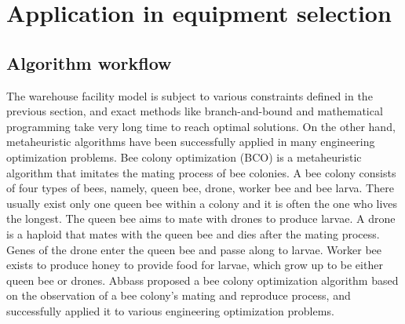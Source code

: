 \section{Application in equipment selection}
\subsection{Algorithm workflow}
The warehouse facility model is subject to various constraints defined in the previous section, and exact methods like branch-and-bound and mathematical programming take very long time to reach optimal solutions.
On the other hand, metaheuristic algorithms have been successfully applied in many engineering optimization problems.
Bee colony optimization (BCO) is a metaheuristic algorithm that imitates the mating process of bee colonies.
A bee colony consists of four types of bees, namely, queen bee, drone, worker bee and bee larva. 
There usually exist only one queen bee within a colony and it is often the one who lives the longest.
The queen bee aims to mate with drones to produce larvae.
A drone is a haploid that mates with the queen bee and dies after the mating process.
Genes of the drone enter the queen bee and passe along to larvae.
Worker bee exists to produce honey to provide food for larvae, which grow up to be either queen bee or drones.
Abbass proposed a bee colony optimization algorithm based on the observation of a bee colony's mating and reproduce process, and successfully applied it to various engineering optimization problems.


